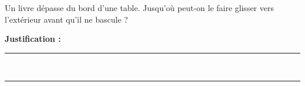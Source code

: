Un livre dépasse du bord d'une table. Jusqu'où peut-on le faire glisser vers l'extérieur avant qu'il ne bascule ?

\choices

\noindent\textbf{Justification :} \hrulefill \\[2.5ex]
\rule{\linewidth}{0.4pt} \\[2.5ex]
\rule{\linewidth}{0.4pt}
\vfill

